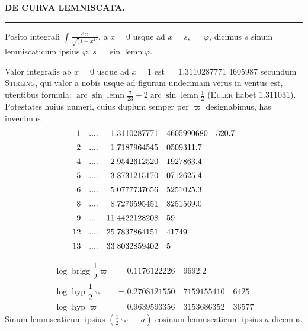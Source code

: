 \clearpage{}

\begin{center}
\textbf{DE CURVA LEMNISCATA.}\par\medskip
\rule{2cm}{0.3pt}
\end{center}

Posito integrali $\int\frac{\mathrm{d}x}{\surd(1-x^4)}$, a $x=0$ usque ad $x=s$, $=\varphi$, dicimus $s$ sinum lemniscaticum ipsius $\varphi$, $s=\sin\operatorname{lemn}\varphi$.

Valor integralis ab $x=0$ usque ad $x=1$ est $=1.3110287771\;4605987$ secundum \textsc{Stirling}, qui valor a nobis usque ad figuram undecimam verus in ventus est, utentibus formula: $\operatorname{arc}\sin\operatorname{lemn}\frac{7}{23}+2\operatorname{arc}\sin\operatorname{lemn}\frac12$ (\textsc{Euler} habet $1.311031$). Potestates huius numeri, cuius duplum semper per $\varpi$ designabimus, has invenimus
\[
\begin{array}{r@{\quad}c@{\quad}r@{\quad}l@{\quad}l}
1& \mathord{.}\mathord{.}\mathord{.}\mathord{.} &1.3110287771&4605990680&320.7\\[5pt]
2& \mathord{.}\mathord{.}\mathord{.}\mathord{.} &1.7187964545&0509311.7&\\[5pt]
4& \mathord{.}\mathord{.}\mathord{.}\mathord{.} &2.9542612520&1927863.4&\\[5pt]
5& \mathord{.}\mathord{.}\mathord{.}\mathord{.} &3.8731215170&0712625\;4&\\[5pt]
6& \mathord{.}\mathord{.}\mathord{.}\mathord{.} &5.0777737656&5251025.3&\\[5pt]
8& \mathord{.}\mathord{.}\mathord{.}\mathord{.} &8.7276595451&8251569.0&\\[5pt]
9& \mathord{.}\mathord{.}\mathord{.}\mathord{.} &11.4422128208&59&\\[5pt]
12& \mathord{.}\mathord{.}\mathord{.}\mathord{.} &25.7837864151&41749&\\[5pt]
13& \mathord{.}\mathord{.}\mathord{.}\mathord{.} &33.8032859402&5&
\end{array}
\]


\[
\begin{aligned}
\operatorname{log}\operatorname{brigg}\dfrac12\varpi&=0.1176122226\quad9692.2\\[5pt]
\operatorname{log}\operatorname{hyp}\dfrac12\varpi&=0.2708121550\quad7159155410\quad6425\\[5pt]
\operatorname{log}\operatorname{hyp}\varpi&=0.9639593356\quad3153686352\quad36577
\end{aligned}
\]
Sinum lemniscaticum ipsius $(\tfrac12\varpi-a)$ cosinum lemniscaticum ipsius $a$ dicemus.


